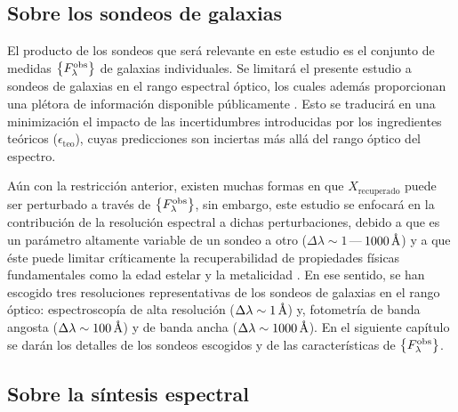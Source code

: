 \subsection{Sobre los sondeos de galaxias}

El producto de los sondeos que será relevante en este estudio es el conjunto de medidas
$\set{\sedt[F]{obs}}$ de galaxias individuales. Se limitará el presente estudio a sondeos de
galaxias en el rango espectral óptico, los cuales además proporcionan una plétora de información
disponible públicamente \citep[\eg,][]{Wolf2003, Moles2008, Abazajian2009}. Esto se traducirá en una
minimización el impacto de las incertidumbres introducidas por los ingredientes teóricos
($\epsilon_\text{teo}$), cuyas predicciones son inciertas más allá del rango óptico del espectro.

Aún con la restricción anterior, existen muchas formas en que $X_\text{recuperado}$ puede ser
perturbado a través de $\set{\sedt[F]{obs}}$, sin embargo, este estudio se enfocará en la
contribución de la resolución espectral a dichas perturbaciones, debido a que es un parámetro
altamente variable de un sondeo a otro ($\Delta\lambda\sim1\,$---$\,\unit[1000]{\AA}$) y a que éste
puede limitar críticamente la recuperabilidad de propiedades físicas fundamentales como la edad
estelar y la metalicidad \citep[\eg,][]{MacArthur2010, Pforr2012, Mitchell2013}. En ese sentido, se
han escogido tres resoluciones representativas de los sondeos de galaxias en el rango óptico:
espectroscopía de alta resolución ($\Delta\lambda\sim\unit[1]{\AA}$) y, fotometría de banda angosta
($\Delta\lambda\sim\unit[100]{\AA}$) y de banda ancha ($\Delta\lambda\sim\unit[1000]{\AA}$). En el
siguiente capítulo se darán los detalles de los sondeos escogidos y de las características de
$\set{\sedt[F]{obs}}$.

\subsection{Sobre la síntesis espectral}

